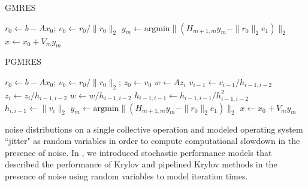 \documentclass[num-refs]{wiley-article}
\begin{document}
\noindent\begin{minipage}[b]{.5\textwidth}
\begin{algorithm}[H]
\caption{GMRES}\label{gmres_alg}
\begin{algorithmic}[1]
   \State $r_0 \gets b-Ax_0$; $v_0 \gets r_0/\|r_0\|_2$
 \EndFor
\State $y_m \gets \text{argmin}\|(H_{m+1, m} y_m - \|r_0\|_2 e_1 )\|_2$
\State $x \gets x_0 + V_m y_m$
\vspace{1.8in}
\end{algorithmic}
\end{algorithm}
\end{minipage}%
\begin{minipage}[b]{.5\textwidth}
\begin{algorithm}[H]
 \caption{PGMRES}\label{pgmres_alg}
\begin{algorithmic}[1]
   \State $r_0 \gets b-Ax_0$; $v_0 \gets r_0/\|r_0\|_2$; $z_0 \gets v_0$
\State $w \gets Az_i$
\State $v_{i-1} \gets v_{i-1}/h_{i-1, i-2}$
\State $z_i \gets z_i/h_{i-1, i-2}$
\State $w \gets w/h_{i-1, i-2}$
\EndFor
\State $h_{i-1, i-1} \gets h_{i-1, i-1}/h^2_{i-1, i-2}$
\EndIf
{}
\State $h_{i, i-1} \gets \|v_i\|_2$
\EndIf
{}
\EndFor
\State $y_m \gets \text{argmin}\|(H_{m+1, m} y_m - \|r_0\|_2 e_1 )\|_2$
\State $x \gets x_0 + V_m y_m$
\end{algorithmic}
\end{algorithm}
\end{minipage}

\noindent  noise distributions on a single collective operation and \cite{seelam2010extreme} modeled operating system 
 ``jitter" as random variables in order to compute computational slowdown in the 
  presence of noise.
In \cite{morgan2016krylov}, we introduced stochastic performance models that described the performance of Krylov and pipelined Krylov methods in the presence of noise using random variables to model iteration times. 
\end{document}
